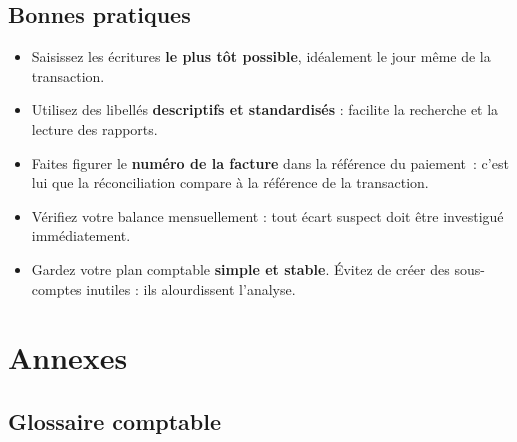 \documentclass[a4paper,11pt,oneside]{article}
\begin{document}
\subsection{Bonnes pratiques}

\begin{itemize}
    \item Saisissez les écritures \textbf{le plus tôt possible}, idéalement le jour même de la transaction.
    \item Utilisez des libellés \textbf{descriptifs et standardisés} : facilite la recherche et la lecture des rapports.
    \item Faites figurer le \textbf{numéro de la facture} dans la référence du paiement~: c'est lui que la réconciliation compare à la référence de la transaction.
    \item Vérifiez votre balance mensuellement : tout écart suspect doit être investigué immédiatement.
    \item Gardez votre plan comptable \textbf{simple et stable}. Évitez de créer des sous-comptes inutiles : ils alourdissent l'analyse.
\end{itemize}

\section{Annexes}

\subsection{Glossaire comptable}
\end{document}
